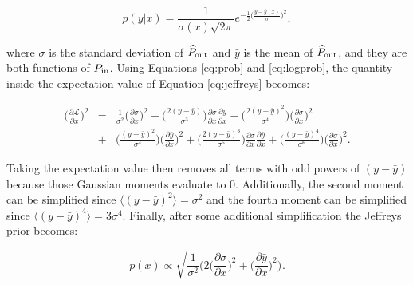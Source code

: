 \documentclass[preprint2,numberedappendix,tighten]{aastex6}  %
\begin{document}
\begin{equation}
\label{eq:prob}
p(y | x) = \frac{1}{\sigma(x) \sqrt{2\pi}} e^{-\frac{1}{2}\big(\frac{y-\bar y(x)}{\sigma}\big)^{2}},
\end{equation}

\noindent where $\sigma$ is the standard deviation of $\widehat{P}_{\rm out}$ and $\bar y$ is the mean of $\widehat{P}_{\rm out}$, and they are both functions of $P_{\rm in}$. Using Equations \eqref{eq:prob} and \eqref{eq:logprob}, the quantity inside the expectation value of Equation \eqref{eq:jeffreys} becomes:



\begin{eqnarray}
\Big(\frac{\partial \mathcal{L}}{\partial x} \Big)^{2} &=& \frac{1}{\sigma^{2}}\Big(\frac{\partial \sigma}{\partial x}\Big)^{2} -  \Big(\frac{2(y-\bar y)}{\sigma^{3}}\Big)\frac{\partial \sigma}{\partial x}\frac{\partial \bar y}{\partial x} - \Big(\frac{2(y-\bar y)^{2}}{\sigma^{4}}\Big)\Big(\frac{\partial \sigma}{\partial x}\Big)^{2} \nonumber \\
&+& \Big(\frac{(y-\bar y)^{2}}{\sigma^{4}}\Big)\Big(\frac{\partial \bar y}{\partial x}\Big)^{2} + \Big(\frac{2(y-\bar y)^{3}}{\sigma^{5}}\Big)\frac{\partial \sigma}{\partial x}\frac{\partial \bar y}{\partial x} + \Big(\frac{(y-\bar y)^{4}}{\sigma^{6}}\Big)\Big(\frac{\partial \sigma}{\partial x}\Big)^{2}.
\end{eqnarray}

Taking the expectation value then removes all terms with odd powers of $(y - \bar y)$ because those Gaussian moments evaluate to 0. Additionally, the second moment can be simplified since $\langle (y - \bar y)^{2} \rangle = \sigma^{2}$ and the fourth moment can be simplified since $\langle (y - \bar y)^{4} \rangle = 3\sigma^{4}$. Finally, after some additional simplification the Jeffreys prior becomes:

\begin{equation}
\label{eq:jeffreys_final}
p(x) \propto \sqrt{ \frac{1}{\sigma^{2}}\Big(2\Big(\frac{\partial \sigma}{\partial x}\Big)^{2} + \Big(\frac{\partial \bar y}{\partial x}\Big)^{2}\Big) }.
\end{equation}
\end{document}

